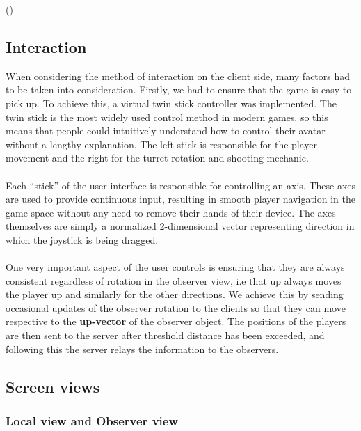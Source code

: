 \documentclass[11pt,a4paper]{article}
\begin{document}
  \begin{algorithm}[H]
    \LinesNumbered
    \Fn(){}{
    }
  \end{algorithm}
   \subsection{Interaction}
     When considering the method of interaction on the client side, many factors had to be taken into consideration. Firstly, we had to ensure that the game is easy to pick up. To achieve this, a virtual twin stick controller was implemented. The twin stick is the most widely used control method in modern games, so this means that people could intuitively understand how to control their avatar without a lengthy explanation. The left stick is responsible for the player movement and the right for the turret rotation and shooting mechanic. \\ \\
     Each “stick” of the user interface is responsible for controlling an axis. These axes are used to provide continuous input, resulting in smooth player navigation in the game space without any need to remove their hands of their device. The axes themselves are simply a normalized 2-dimensional vector representing direction in which the joystick is being dragged. \\ \\
     One very important aspect of the user controls is ensuring that they are always consistent regardless of rotation in the observer view, i.e that up always moves the player up and similarly for the other directions. We achieve this by sending occasional updates of the observer rotation to the clients so that they can move respective to the \textbf{up-vector} of the observer object. The positions of the players are then sent to the server after threshold distance has been exceeded, and following this the server relays the information to the observers.


  \pagebreak
  \subsection{Screen views}


   \subsubsection{Local view and Observer view}
\end{document}
